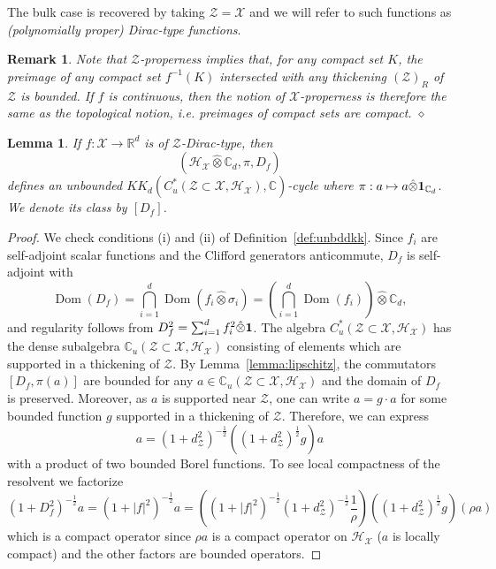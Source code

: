 \documentclass[12pt]{amsart}
\newtheorem{lemma}[theorem]{Lemma}
\newtheorem{remark}[theorem]{Remark}
\newcommand{\CM}{{\mathbb C}}
\newcommand{\RM}{{\mathbb R}}
\newcommand{\Hh}{{\mathcal H}}
\newcommand{\Xx}{{\mathcal X}}
\newcommand{\Zz}{{\mathcal Z}}
\newcommand{\one}{{\bf 1}}
\providecommand{\abs}[1]{\left \lvert#1 \right \rvert}
\DeclareMathOperator*{\Dom}{Dom}
\begin{document}
The bulk case is recovered by taking $\Zz=\Xx$ and we will refer to such functions as \emph{(polynomially proper) Dirac-type functions}.
\begin{remark}
{\rm Note that $\Zz$-properness implies that, for any compact set $K$, the preimage of any compact set $f^{-1}(K)$ intersected with any thickening $(\Zz)_R$ of $\Zz$ is bounded. 
If $f$ is continuous, then the notion of $\Xx$-properness is therefore the same as the topological notion, i.e. preimages of compact sets are compact.} $\diamond$
\end{remark}
\begin{lemma}
\label{lemma:dirac_op}
If $f:\Xx\to\RM^d$ is of $\Zz$-Dirac-type, then
\[
 (\Hh_{\Xx} \hat{\otimes} \CM_d,\pi,D_f)
\]
defines an unbounded $KK_d(C^*_u(\Zz\subset \Xx, \Hh_\Xx),\CM)$-cycle where $\pi: a\mapsto a\hat{\otimes}\one_{\CM_d}$. We denote its class by $[D_f]$. 
\end{lemma}
\begin{proof}
We check conditions (i) and (ii) of Definition~\ref{def:unbddkk}. Since $f_i$ are self-adjoint scalar functions and the Clifford generators anticommute, $D_f$ is self-adjoint with 
\[\Dom(D_f) = \bigcap_{i=1}^d \Dom( {f_i} \hat{\otimes} \sigma_i)=\left(\bigcap_{i=1}^d \Dom( {f_i})\right) \hat{\otimes} \CM_d,\]
and regularity follows from $D_f^2 = \sum_{i=1}^d f_i^2 \hat{\otimes} \one$.
The algebra $C^*_{u}(\Zz\subset \Xx, \Hh_\Xx)$ has the dense subalgebra $\CM_{u}(\Zz\subset \Xx, \Hh_\Xx)$ consisting of elements which are supported in a thickening of $\Zz$. By Lemma~\ref{lemma:lipschitz}, the commutators $[D_f,\pi(a)]$ are bounded for any $a\in \CM_u(\Zz\subset\Xx, \Hh_\Xx)$ and the domain of $D_f$ is preserved.
Moreover, as $a$ is supported near $\Zz$, one can write $a= g \cdot a$ for some bounded function $g$ supported in a thickening of $\Zz$. Therefore, we can express
\[a = (1+d_\Zz^{2})^{-\frac12} \left( (1+d^2_\Zz)^\frac12 g\right) a\]
with a product of two bounded Borel functions. To see local compactness of the resolvent we factorize
\begin{equation}
\label{eq:resolvent_with_boundary_stuff_factored}
(1+D_f^2)^{-\frac12}a= (1+\abs{f}^2)^{-\frac12} a = \left((1+\abs{f}^2)^{-\frac12}(1+d_\Zz^{2})^{-\frac12}\frac{1}{\rho}\right) \left( (1+d^2_\Zz)^\frac12 g\right) (\rho a)
\end{equation}
which is a compact operator since $\rho a$ is a compact operator on $\Hh_\Xx$ ($a$ is locally compact) and the other factors are bounded operators.
\end{proof}
\end{document}
